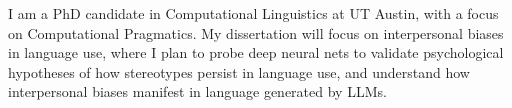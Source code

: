 I am a PhD candidate in Computational Linguistics at UT Austin, with a focus on Computational Pragmatics. My dissertation will focus on interpersonal biases in language use, where I plan to probe deep neural nets to validate psychological hypotheses of how stereotypes persist in language use, and understand how interpersonal biases manifest in language generated by LLMs.
